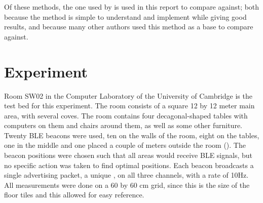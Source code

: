 Of these methods, the one used by \citet{bahl2000radar} is used in this report to compare against; both because the method is simple to understand and implement while giving good results, and because many other authors used this method as a base to compare against.

\section{Experiment}
\label{sec:architecture-experiment}
Room SW02 in the Computer Laboratory of the University of Cambridge is the test bed for this experiment.
The room consists of a square 12 by 12 meter main area, with several coves.
The room contains four decagonal-shaped tables with computers on them and chairs around them, as well as some other furniture.
Twenty BLE beacons were used, ten on the walls of the room, eight on the tables, one in the middle and one placed a couple of meters outside the room ().
The beacon positions were chosen such that all areas would receive BLE signals, but no specific action was taken to find optimal positions.
Each beacon broadcasts a single advertising packet, a unique \bid, on all three channels, with a rate of 10Hz.
All measurements were done on a 60 by 60 cm grid, since this is the size of the floor tiles and this allowed for easy reference.


